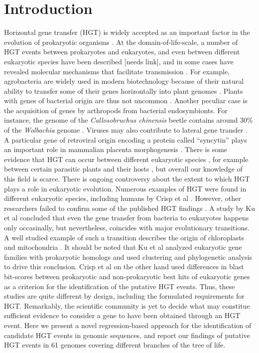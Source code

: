 \section{Introduction}
\label{intro}
Horizontal gene transfer (HGT) is widely accepted as an important
factor in the evolution of prokaryotic organisms \cite{Ochman2000}. At the
domain-of-life-scale, a number of HGT events between prokaryotes and
eukaryotes, and even between different eukaryotic species have been described
[needs link], and in some cases have revealed molecular mechanisms that
facilitate transmission \cite{Soucy2015}. For example, agrobacteria are widely
used in modern biotechnology because of their natural ability to transfer some
of their genes horizontally into plant genomes \cite{Chilton1977}. Plants with
genes of bacterial origin are thus not uncommon \cite{Kyndt2015, Matveeva2012,
Matveeva2014}. Another peculiar case is the acquisition of genes by arthropods
from bacterial endosymbionts. For instance, the genome of the
\textit{Callosobruchus chinensis} beetle contains around 30\% of the
\textit{Wolbachia} genome \cite{Nikoh2008}. Viruses may also contribute to
lateral gene transfer \cite{Drezen2017}. A particular gene of retroviral origin
encoding a protein called ``syncytin'' plays an important role in mammalian
placenta morphogenesis \cite{Mi2000}. There is some evidence that HGT can occur
between different eukaryotic species \cite{Soucy2015}, for example between
certain parasitic plants and their hosts
\cite{Yoshida2010,Xi2012,Zhang2013,Zhang2014}, but overall our knowledge of
this field is scarce. There is ongoing controversy about the extent to which
HGT plays a role in eukaryotic evolution. Numerous examples of HGT were found
in different eukaryotic species, including humans by Crisp et al
\cite{Crisp2015}. However, other researchers failed to confirm some of the
published HGT findings \cite{Salzberg2017}. A study by Ku et al concluded that
even the gene transfer from bacteria to eukaryotes happens only occasinally,
but nevertheless, coincides
with major evolutionary transitions. A well studied example of such a
transition describes the origin of chloroplasts and
mitochondria \cite{Ku2015}. It should be noted that Ku et al analyzed
eukaryotic gene families with prokaryotic homologs and used clustering and
phylogenetic analysis to drive this conclusion. Crisp et al on the other hand
used differences in blast bit-scores between prokaryotic and non-prokaryotic
best hits of eukaryotic genes as a criterion for the identification of the
putative HGT events. Thus, these studies are quite different by design, including the
formulated requirements for HGT. Remarkably, the scientific community is yet to
decide what may constitue sufficient evidence to consider a gene to
have been obtained through an HGT event.
Here we present a novel regression-based approach for the
identification of candidate HGT events in genomic sequences, and report our findings
of putative HGT events in 61 genomes covering different branches of the tree of
life.
